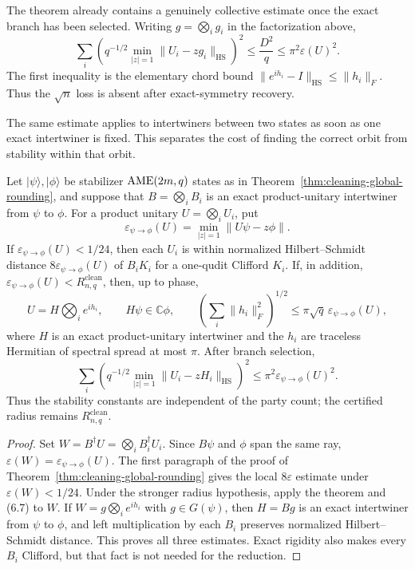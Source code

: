 The theorem already contains a genuinely collective estimate once the
exact branch has been selected.  Writing \(g=\bigotimes_i g_i\) in the
factorization above,
\[
 \sum_i\left(q^{-1/2}\min_{|z|=1}
   \lVert U_i-zg_i\rVert_{\mathrm{HS}}\right)^2
 \leq \frac{D^2}{q}
 \leq \pi^2\varepsilon(U)^2.                         \tag{6.7}
\]
The first inequality is the elementary chord bound
\(\lVert e^{ih_i}-I\rVert_{\mathrm{HS}}\leq\lVert h_i\rVert_F\).
Thus the \(\sqrt n\) loss is absent after exact-symmetry recovery.

The same estimate applies to intertwiners between two states as soon as one
exact intertwiner is fixed.  This separates the cost of finding the correct
orbit from stability within that orbit.

\begin{corollary}
\label{cor:relative-intertwiner-rounding}
Let \(\lvert\psi\rangle,\lvert\phi\rangle\) be stabilizer
\(\mathrm{AME}(2m,q)\) states as in
Theorem~\ref{thm:cleaning-global-rounding}, and suppose that
\(B=\bigotimes_iB_i\) is an exact product-unitary intertwiner from
\(\psi\) to \(\phi\).  For a product unitary \(U=\bigotimes_iU_i\), put
\[
 \varepsilon_{\psi\to\phi}(U)=
 \min_{|z|=1}\lVert U\psi-z\phi\rVert.
\]
If \(\varepsilon_{\psi\to\phi}(U)<1/24\), then each \(U_i\) is within
normalized Hilbert--Schmidt distance
\(8\varepsilon_{\psi\to\phi}(U)\) of \(B_iK_i\) for a one-qudit Clifford
\(K_i\).  If, in addition,
\(\varepsilon_{\psi\to\phi}(U)<R^{\mathrm{clean}}_{n,q}\), then, up to
phase,
\[
 U=H\bigotimes_i e^{ih_i},
 \qquad H\psi\in\mathbb C\phi,
 \qquad
 \left(\sum_i\lVert h_i\rVert_F^2\right)^{1/2}
 \leq\pi\sqrt q\,\varepsilon_{\psi\to\phi}(U),
\]
where \(H\) is an exact product-unitary intertwiner and the \(h_i\) are
traceless Hermitian of spectral spread at most \(\pi\).  After branch
selection,
\[
 \sum_i\left(q^{-1/2}\min_{|z|=1}
   \lVert U_i-zH_i\rVert_{\mathrm{HS}}\right)^2
 \leq\pi^2\varepsilon_{\psi\to\phi}(U)^2.
\]
Thus the stability constants are independent of the party count; the
certified radius remains \(R^{\mathrm{clean}}_{n,q}\).
\end{corollary}

\begin{proof}
Set \(W=B^\dagger U=\bigotimes_iB_i^\dagger U_i\).  Since \(B\psi\) and
\(\phi\) span the same ray,
\(\varepsilon(W)=\varepsilon_{\psi\to\phi}(U)\).  The first paragraph of
the proof of Theorem~\ref{thm:cleaning-global-rounding} gives the local
\(8\varepsilon\) estimate under \(\varepsilon(W)<1/24\).  Under the
stronger radius hypothesis, apply the theorem and (6.7) to \(W\).  If
\(W=g\bigotimes_i e^{ih_i}\) with \(g\in G(\psi)\), then \(H=Bg\) is an
exact intertwiner from \(\psi\) to \(\phi\), and left multiplication by
each \(B_i\) preserves normalized Hilbert--Schmidt distance.  This proves
all three estimates.  Exact rigidity also makes every \(B_i\) Clifford, but
that fact is not needed for the reduction.
\end{proof}

